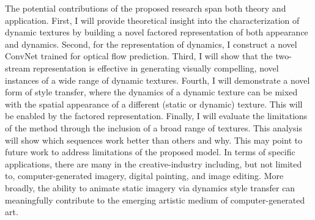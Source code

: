 The potential contributions of the proposed research span both theory and application. First, I will provide theoretical insight into the characterization of dynamic textures by building a novel factored representation of both appearance and dynamics. Second, for the representation of dynamics, I construct a novel ConvNet trained for optical flow prediction. Third, I will show that the two-stream representation is effective in generating visually compelling, novel instances of a wide range of dynamic textures. Fourth, I will demonstrate a novel form of style transfer, where the dynamics of a dynamic texture can be mixed with the spatial appearance of a different (static or dynamic) texture. This will be enabled by the factored representation. Finally, I will evaluate the limitations of the method through the inclusion of a broad range of textures. This analysis will show which sequences work better than others and why. This may point to future work to address limitations of the proposed model. In terms of specific applications, there are many in the creative-industry including, but not limited to, computer-generated imagery, digital painting, and image editing. More broadly, the ability to animate static imagery via dynamics style transfer can meaningfully contribute to the emerging artistic medium of computer-generated art.